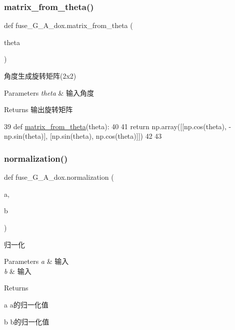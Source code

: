 \subsubsection{\texorpdfstring{matrix\+\_\+from\+\_\+theta()}{matrix\_from\_theta()}}
{\footnotesize\ttfamily def fuse\+\_\+\+G\+\_\+\+A\+\_\+dox.\+matrix\+\_\+from\+\_\+theta (\begin{DoxyParamCaption}\item[{}]{theta }\end{DoxyParamCaption})}



角度生成旋转矩阵(2x2) 


\begin{DoxyParams}{Parameters}
{\em theta} & 输入角度\\
\hline
\end{DoxyParams}
\begin{DoxyReturn}{Returns}
输出旋转矩阵 
\end{DoxyReturn}

\begin{DoxyCode}
39 \textcolor{keyword}{def }\hyperlink{namespacefuse___g___a__dox_a74ca52501813c654c46db737d87fd009}{matrix\_from\_theta}(theta):
40 
41     \textcolor{keywordflow}{return} np.array([[np.cos(theta), -np.sin(theta)], [np.sin(theta), np.cos(theta)]])
42 
43 
\end{DoxyCode}
\mbox{\label{namespacefuse___g___a__dox_ab338e80a4f259a8d14b03d63b4c19d3b}} 
\subsubsection{\texorpdfstring{normalization()}{normalization()}}
{\footnotesize\ttfamily def fuse\+\_\+\+G\+\_\+\+A\+\_\+dox.\+normalization (\begin{DoxyParamCaption}\item[{}]{a,  }\item[{}]{b }\end{DoxyParamCaption})}



归一化 


\begin{DoxyParams}{Parameters}
{\em a} & 输入 \\
\hline
{\em b} & 输入\\
\hline
\end{DoxyParams}
\begin{DoxyReturn}{Returns}


a a的归一化值 

b b的归一化值 
\end{DoxyReturn}

